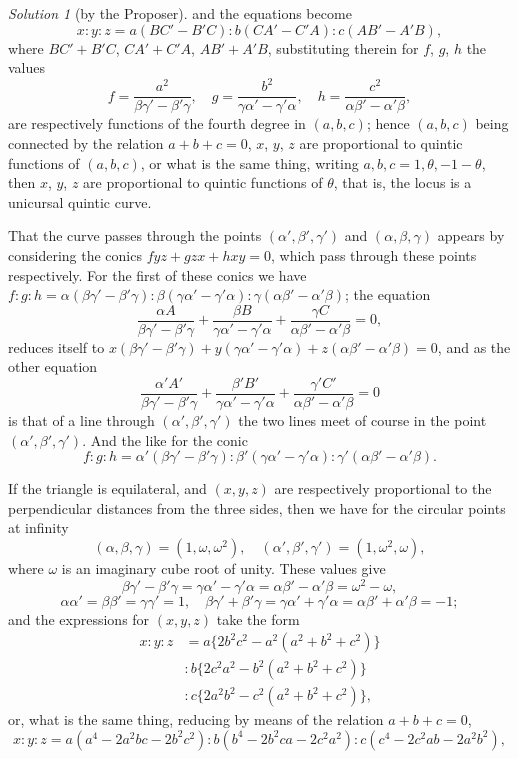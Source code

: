 \documentclass[12pt,a4paper]{article}
\theoremstyle{plain}
\theoremstyle{definition}
\theoremstyle{remark}
\newtheorem*{solution}{Solution}
\begin{document}
\begin{solution}[by the Proposer]
and the equations become
\[
x : y : z = a(BC' - B'C) : b(CA' - C'A) : c(AB' - A'B),
\]
where $BC' + B'C$, $CA' + C'A$, $AB' + A'B$, substituting therein for $f$, $g$, $h$ the values
\[
f = \frac{a^2}{\beta\gamma' - \beta'\gamma}, \quad
 g = \frac{b^2}{\gamma\alpha' - \gamma'\alpha}, \quad
 h = \frac{c^2}{\alpha\beta' - \alpha'\beta},
\]
are respectively functions of the fourth degree in $(a, b, c)$; hence $(a, b, c)$ being connected by the relation $a + b + c = 0$, $x$, $y$, $z$ are proportional to quintic functions of $(a, b, c)$, or what is the same thing, writing $a, b, c = 1, \theta, -1 - \theta$, then $x$, $y$, $z$ are proportional to quintic functions of $\theta$, that is, the locus is a unicursal quintic curve.

That the curve passes through the points $(\alpha', \beta', \gamma')$ and $(\alpha, \beta, \gamma)$ appears by considering the conics $fyz + gzx + hxy = 0$, which pass through these points respectively. For the first of these conics we have $f : g : h = \alpha(\beta\gamma' - \beta'\gamma) : \beta(\gamma\alpha' - \gamma'\alpha) : \gamma(\alpha\beta' - \alpha'\beta)$; the equation
\[
\frac{\alpha A}{\beta\gamma' - \beta'\gamma} + \frac{\beta B}{\gamma\alpha' - \gamma'\alpha} + \frac{\gamma C}{\alpha\beta' - \alpha'\beta} = 0,
\]
reduces itself to $x(\beta\gamma' - \beta'\gamma) + y(\gamma\alpha' - \gamma'\alpha) + z(\alpha\beta' - \alpha'\beta) = 0$, and as the other equation
\[
\frac{\alpha' A'}{\beta\gamma' - \beta'\gamma} + \frac{\beta' B'}{\gamma\alpha' - \gamma'\alpha} + \frac{\gamma' C'}{\alpha\beta' - \alpha'\beta} = 0
\]
is that of a line through $(\alpha', \beta', \gamma')$ the two lines meet of course in the point $(\alpha', \beta', \gamma')$. And the like for the conic
\[
f : g : h = \alpha'(\beta\gamma' - \beta'\gamma) : \beta'(\gamma\alpha' - \gamma'\alpha) : \gamma'(\alpha\beta' - \alpha'\beta).
\]

If the triangle is equilateral, and $(x, y, z)$ are respectively proportional to the perpendicular distances from the three sides, then we have for the circular points at infinity
\[
(\alpha, \beta, \gamma) = (1, \omega, \omega^2), \quad (\alpha', \beta', \gamma') = (1, \omega^2, \omega),
\]
where $\omega$ is an imaginary cube root of unity. These values give
\[
\beta\gamma' - \beta'\gamma = \gamma\alpha' - \gamma'\alpha = \alpha\beta' - \alpha'\beta = \omega^2 - \omega,
\]
\[
\alpha\alpha' = \beta\beta' = \gamma\gamma' = 1, \quad
\beta\gamma' + \beta'\gamma = \gamma\alpha' + \gamma'\alpha = \alpha\beta' + \alpha'\beta = -1;
\]
and the expressions for $(x, y, z)$ take the form
\begin{align*}
x : y : z &= a\{2b^2c^2 - a^2(a^2 + b^2 + c^2)\} \\
&: b\{2c^2a^2 - b^2(a^2 + b^2 + c^2)\} \\
&: c\{2a^2b^2 - c^2(a^2 + b^2 + c^2)\},
\end{align*}
or, what is the same thing, reducing by means of the relation $a + b + c = 0$,
\[
x : y : z = a(a^4 - 2a^2bc - 2b^2c^2) : b(b^4 - 2b^2ca - 2c^2a^2) : c(c^4 - 2c^2ab - 2a^2b^2),
\]


\end{solution}
\end{document}
